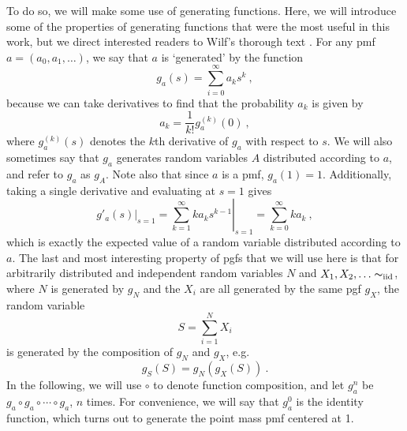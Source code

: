 \documentclass[12pt]{article}
\newcommand{\iid}{\mathrm{iid}}
\begin{document}
To do so, we will make some use of generating functions. Here, we will introduce some
of the properties of generating functions that were the most useful in this work,
but we direct interested readers to Wilf's thorough text \cite{wilf}. For any
pmf $a=(a_0,a_1,\dotsc)$, we say that $a$ is `generated' by the function
\[g_a(s) = \sum_{i=0}^\infty a_k s^k\ , \]
because we can take derivatives to find that the probability $a_k$ is given
by
\[ a_k = \frac{1}{k!}{g^{(k)}_a(0)}\ , \]
where $g^{(k)}_a(s)$ denotes the $k$th derivative of $g_a$ with respect to $s$.
We will also sometimes say that $g_a$ generates random variables $A$ distributed
according to $a$, and refer to $g_a$ as $g_A$.
Note also that since $a$ is a pmf, $g_a(1)=1$. Additionally, taking a single
derivative and evaluating at $s=1$ gives
\[ \left.g'_a(s)\right\rvert_{s=1} = \left.\sum_{k=1}^\infty k a_k s^{k-1} \right\rvert_{s=1} = \sum_{k=0}^\infty k a_k\ , \]
which is exactly the expected value of a random variable distributed according to $a$.
The last and most interesting property of pgfs that we will use here is
that for arbitrarily distributed and independent random variables
$N$ and $X_1,X_2,\dotsc \thicksim_\iid$, where $N$ is generated by $g_N$ and
the $X_i$ are all generated by the same pgf $g_X$, the random variable
\[ S = \sum_{i=1}^N X_i \]
is generated by the composition of $g_N$ and $g_X$, e.g. \[ g_S(S) = g_N(g_X(S))\ . \]
In the following, we will use $\circ$ to denote function composition, and let
$g_a^n$ be $g_a \circ g_a \circ \dotsm \circ g_a$, $n$ times. For convenience,
we will say that $g_a^0$ is the identity function, which turns out to
generate the point mass pmf centered at 1.\par
\end{document}
